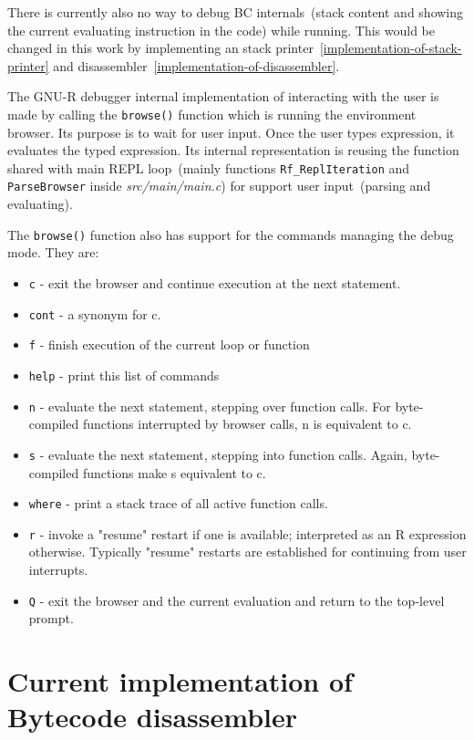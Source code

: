 \documentclass[thesis=M,english]{FITthesis}[2018/10/20]
\newcommand{\code}[1]{\texttt{#1}}
\begin{document}
There is currently also no way to debug BC internals~(stack content and showing the current evaluating instruction in the code) while running. This would be changed in this work by implementing an stack printer~\ref{implementation-of-stack-printer} and disassembler~\ref{implementation-of-disassembler}.

The GNU-R debugger internal implementation of interacting with the user is made by calling the \code{browse()} function which is running the environment browser. Its purpose is to wait for user input. Once the user types expression, it evaluates the typed expression. Its internal representation is reusing the function shared with main REPL loop~(mainly functions \code{Rf{\_}ReplIteration} and \code{ParseBrowser} inside \textit{src/main/main.c}) for support user input~(parsing and evaluating).

The \code{browse()} function also has support for the commands managing the debug mode. They are:
\begin{itemize}
\item \code{c} - exit the browser and continue execution at the next statement.
\item \code{cont} - a synonym for c.
\item \code{f} - finish execution of the current loop or function
\item \code{help} - print this list of commands
\item \code{n} - evaluate the next statement, stepping over function calls. For byte-compiled functions interrupted by browser calls, n is equivalent to c.
\item \code{s} - evaluate the next statement, stepping into function calls. Again, byte-compiled functions make s equivalent to c.
\item \code{where} - print a stack trace of all active function calls.
\item \code{r} - invoke a "resume" restart if one is available; interpreted as an R expression otherwise. Typically "resume" restarts are established for continuing from user interrupts.
\item \code{Q} - exit the browser and the current evaluation and return to the top-level prompt.

\end{itemize}

\section{Current implementation of Bytecode disassembler}\label{current-bc-disassembler}
\end{document}
